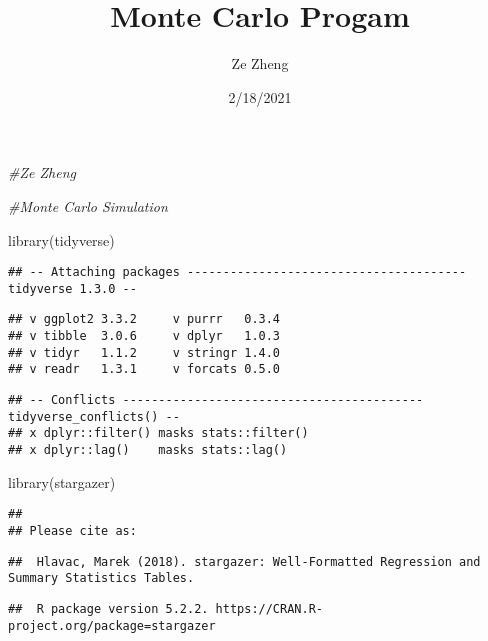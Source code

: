 \documentclass[
]{article}
\title{Monte Carlo Progam}
\author{Ze Zheng}
\date{2/18/2021}
\newenvironment{Shaded}{\begin{snugshade}}{\end{snugshade}}
\newcommand{\CommentTok}[1]{\textcolor[rgb]{0.56,0.35,0.01}{\textit{#1}}}
\newcommand{\FunctionTok}[1]{\textcolor[rgb]{0.00,0.00,0.00}{#1}}
\newcommand{\NormalTok}[1]{#1}
\begin{document}
\maketitle

\begin{Shaded}
\begin{Highlighting}[]
\CommentTok{\#Ze Zheng}

\CommentTok{\#Monte Carlo Simulation}

\FunctionTok{library}\NormalTok{(tidyverse)}
\end{Highlighting}
\end{Shaded}

\begin{verbatim}
## -- Attaching packages --------------------------------------- tidyverse 1.3.0 --
\end{verbatim}

\begin{verbatim}
## v ggplot2 3.3.2     v purrr   0.3.4
## v tibble  3.0.6     v dplyr   1.0.3
## v tidyr   1.1.2     v stringr 1.4.0
## v readr   1.3.1     v forcats 0.5.0
\end{verbatim}

\begin{verbatim}
## -- Conflicts ------------------------------------------ tidyverse_conflicts() --
## x dplyr::filter() masks stats::filter()
## x dplyr::lag()    masks stats::lag()
\end{verbatim}

\begin{Shaded}
\begin{Highlighting}[]
\FunctionTok{library}\NormalTok{(stargazer)}
\end{Highlighting}
\end{Shaded}

\begin{verbatim}
## 
## Please cite as:
\end{verbatim}

\begin{verbatim}
##  Hlavac, Marek (2018). stargazer: Well-Formatted Regression and Summary Statistics Tables.
\end{verbatim}

\begin{verbatim}
##  R package version 5.2.2. https://CRAN.R-project.org/package=stargazer
\end{verbatim}
\end{document}
